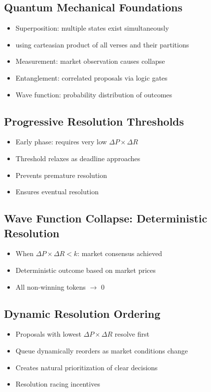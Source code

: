 \documentclass{article}
\begin{document}
\subsection{Quantum Mechanical Foundations}
\begin{itemize}
    \item Superposition: multiple states exist simultaneously
    \item using carteasian product of all verses and their partitions
    \item Measurement: market observation causes collapse
    \item Entanglement: correlated proposals via logic gates
    \item Wave function: probability distribution of outcomes
\end{itemize}

\subsection{Progressive Resolution Thresholds}
\begin{itemize}
    \item Early phase: requires very low $\Delta P \times \Delta R$
    \item Threshold relaxes as deadline approaches
    \item Prevents premature resolution
    \item Ensures eventual resolution
\end{itemize}

\subsection{Wave Function Collapse: Deterministic Resolution}
\begin{itemize}
   \item When $\Delta P \times \Delta R < k$: market consensus achieved
   \item Deterministic outcome based on market prices
   \item All non-winning tokens $\rightarrow$ 0
\end{itemize}

\subsection{Dynamic Resolution Ordering}
\begin{itemize}
    \item Proposals with lowest $\Delta P \times \Delta R$ resolve first
    \item Queue dynamically reorders as market conditions change
    \item Creates natural prioritization of clear decisions
    \item Resolution racing incentives
\end{itemize}
\end{document}

